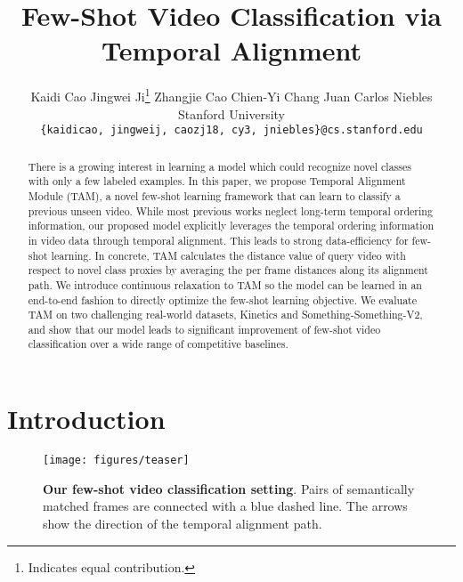 \documentclass[10pt,twocolumn,letterpaper]{article}
\newcommand*\samethanks[1][\value{footnote}]{\footnotemark[#1]}
\begin{document}
\title{Few-Shot Video Classification via Temporal Alignment}

\author{Kaidi Cao \hspace{9pt} Jingwei Ji\thanks{Indicates equal contribution.} \hspace{9pt} Zhangjie Cao\samethanks \hspace{9pt} Chien-Yi Chang \hspace{9pt} Juan Carlos Niebles\\
Stanford University\\
{\tt\small \{kaidicao, jingweij, caozj18, cy3, jniebles\}@cs.stanford.edu}
}

\maketitle


\begin{abstract}
There is a growing interest in learning a model which could recognize novel classes with only a few labeled examples. 
In this paper, we propose Temporal Alignment Module (TAM), a novel few-shot learning framework that can learn to classify a previous unseen video. While most previous works neglect long-term temporal ordering information, our proposed model explicitly leverages the temporal ordering information in video data through temporal alignment. This leads to strong data-efficiency for few-shot learning. In concrete, TAM calculates the distance value of query video with respect to novel class proxies by averaging the per frame distances along its alignment path. We introduce continuous relaxation to TAM so the model can be learned in an end-to-end fashion to directly optimize the few-shot learning objective. We evaluate TAM on two challenging real-world datasets, Kinetics and Something-Something-V2, and show that our model leads to significant improvement of few-shot video classification over a wide range of competitive baselines.

\end{abstract}

\section{Introduction}

\begin{figure}[t]
    \centering
    \texttt{[image: figures/teaser]}
    \caption{\textbf{Our few-shot video classification setting}. Pairs of semantically matched frames are connected with a blue dashed line. The arrows show the direction of the temporal alignment path.}
    \label{fig:teaser}
\end{figure}
\end{document}
